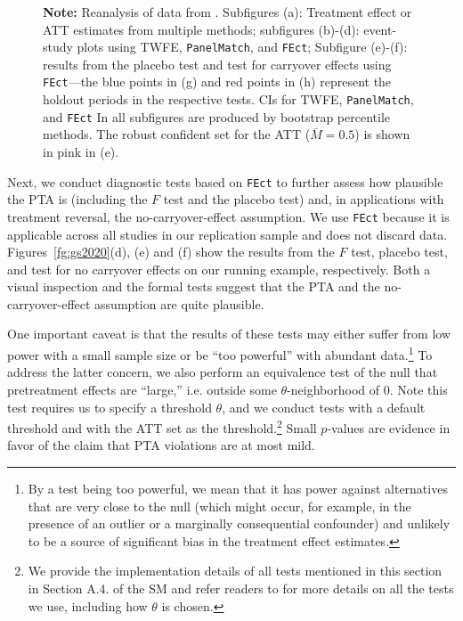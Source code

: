 \documentclass[12pt]{article}
\begin{document}
\begin{figure}[!ht]
\begin{minipage}{1\linewidth}
{\begin{center}
  \end{center}
{\footnotesize\textbf{Note:} Reanalysis of data from \citet{Grumbach2020}. Subfigures (a): Treatment effect or ATT estimates from multiple methods; subfigures (b)-(d): event-study plots using TWFE, \texttt{PanelMatch}, and \texttt{FEct}; Subfigure (e)-(f): results from the placebo test and test for carryover effects using \texttt{FEct}---the blue points in (g) and red points in (h) represent the holdout periods in the respective tests. CIs for TWFE, \texttt{PanelMatch}, and \texttt{FEct} In all subfigures are produced by bootstrap percentile methods. The robust confident set for the ATT ($\bar{M} = 0.5$) is shown in pink in (e).}} \end{minipage}\vspace{-0.5em}
  \end{figure}

Next, we conduct diagnostic tests based on \texttt{FEct} to further assess how plausible the PTA is  (including the $F$ test and the placebo test) and, in applications with treatment reversal, the no-carryover-effect assumption. We use \texttt{FEct} because it is applicable across all studies in our replication sample and does not discard data. Figures~\ref{fg:gs2020}(d), (e) and (f) show the results from the $F$ test, placebo test, and test for no carryover effects on our running example, respectively. Both a visual inspection and the formal tests suggest that the PTA and the no-carryover-effect assumption are quite plausible. 

One important caveat is that the results of these tests may either suffer from low power with a small sample size or be ``too powerful'' with abundant data.\footnote{By a test being too powerful, we mean that it has power against alternatives that are very close to the null (which might occur, for example, in the presence of an outlier or a marginally consequential confounder) and unlikely to be a source of significant bias in the treatment effect estimates.} To address the latter concern, we also perform an equivalence test of the null that pretreatment effects are ``large,'' i.e. outside some $\theta$-neighborhood of 0. Note this test requires us to specify a threshold $\theta$, and we conduct tests with a default threshold and with the ATT set as the threshold.\footnote{We provide the implementation details of all tests mentioned in this section in Section A.4. of the SM and refer readers to \citet{LWX2022} for more details on all the tests we use, including how $\theta$ is chosen.} Small $p$-values are evidence in favor of the claim that PTA violations are at most mild. 
\end{document}
